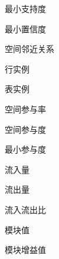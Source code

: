 \documentclass[preprint,MD,numbers,times,AutoFakeBold]{cumtthesis}
\begin{document}






\tableofcontents
\tableofecontents

\listoffigures
\listoftables

\begin{notation}[2.5cm]
\item[$min\_s$] 最小支持度
\item[$min\_c$] 最小置信度
\item[$R$] 空间邻近关系
\item[$row\_instance$]  行实例
\item[$table\_instance$] 表实例
\item[$PR(c,f_i)$] 空间参与率
\item[$PI(c)$] 空间参与度
\item[$min\_prev$] 最小参与度
\item[$\delta_i$] 流入量
\item[$\omega_i$] 流出量
\item[$\psi_i$] 流入流出比
\item[$Q$] 模块值
\item[$\Delta Q$] 模块增益值
\end{notation}


\mainmatter





\backmatter





%


\clearpage
\end{document}
